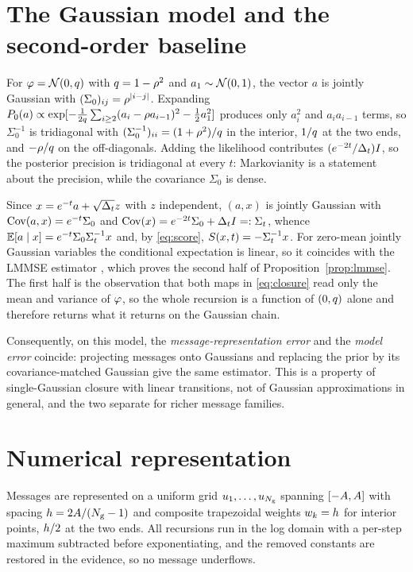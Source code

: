 \section{The Gaussian model and the second-order baseline}
\label{app:lmmse}

For $\varphi=\mathcal{N}\!\left(0,q\right)$ with $q=1-\rho^2$ and $a_1\sim\mathcal{N}\!\left(0,1\right)$, the vector $a$
is jointly Gaussian with $(\Sigma_0)_{ij}=\rho^{|i-j|}$. Expanding
$P_0(a)\propto\exp[-\tfrac{1}{2q}\sum_{i\ge2}(a_i-\rho a_{i-1})^2 - \tfrac12 a_1^2]$
produces only $a_i^2$ and $a_ia_{i-1}$ terms, so $\Sigma_0^{-1}$ is tridiagonal with
$(\Sigma_0^{-1})_{ii} = (1+\rho^2)/q$ in the interior, $1/q$ at the two ends, and
$-\rho/q$ on the off-diagonals. Adding the likelihood contributes $(e^{-2t}/\Delta_t)I$, so the
posterior precision is tridiagonal at every $t$: Markovianity is a statement about the precision,
while the covariance $\Sigma_0$ is dense.

Since $x = e^{-t}a + \sqrt{\Delta_t}z$ with $z$ independent, $(a,x)$ is jointly Gaussian with
$\operatorname{Cov}(a,x) = e^{-t}\Sigma_0$ and $\operatorname{Cov}(x) = e^{-2t}\Sigma_0 + \Delta_t I =: \Sigma_t$, whence
$\mathbb{E}[a\mid x] = e^{-t}\Sigma_0\Sigma_t^{-1}x$ and, by \eqref{eq:score},
$S(x,t) = -\Sigma_t^{-1}x$. For zero-mean jointly Gaussian variables the conditional
expectation is linear, so it coincides with the LMMSE estimator \citep{kay1993}, which proves the
second half of Proposition~\ref{prop:lmmse}. The first half is the observation that both maps in
\eqref{eq:closure} read only the mean and variance of $\varphi$, so the whole recursion is a
function of $(0,q)$ alone and therefore returns what it returns on the Gaussian chain.

Consequently, on this model, the \emph{message-representation error} and the \emph{model error}
coincide: projecting messages onto Gaussians and replacing the prior by its covariance-matched
Gaussian give the same estimator. This is a property of single-Gaussian closure with linear
transitions, not of Gaussian approximations in general, and the two separate for richer message
families.

\section{Numerical representation}
\label{app:numerics}

Messages are represented on a uniform grid $u_{1},\dots,u_{N_{\mathrm{g}}}$ spanning
$[-A,A]$ with spacing $h = 2A/(N_{\mathrm{g}}-1)$ and composite
trapezoidal weights $w_k = h$ for interior points, $h/2$ at the two ends. All
recursions run in the log domain with a per-step maximum subtracted before exponentiating, and
the removed constants are restored in the evidence, so no message underflows.

